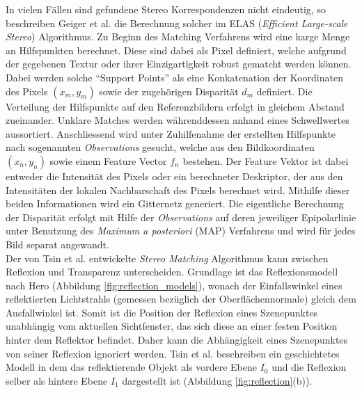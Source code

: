 \noindent
In vielen Fällen sind gefundene Stereo Korrespondenzen nicht eindeutig, so beschreiben Geiger et al. \cite{geiger2011efficient} die Berechnung solcher im ELAS (\emph{Efficient Large-scale Stereo}) Algorithmus. Zu Beginn des Matching Verfahrens wird eine karge Menge an Hilfspunkten berechnet. Diese sind dabei als Pixel definiert, welche aufgrund der gegebenen Textur oder ihrer Einzigartigkeit robust gematcht werden können. Dabei werden solche \enquote{Support Points} als eine Kon­ka­te­na­ti­on der Koordinaten des Pixels $(x_m,y_m)$ sowie der zugehörigen Disparität $d_m$ definiert. Die Verteilung der Hilfspunkte auf den Referenzbildern erfolgt in gleichem Abstand zueinander. Unklare Matches werden währenddessen anhand eines Schwellwertes aussortiert. Anschliessend wird unter Zuhilfenahme der erstellten Hilfspunkte nach sogenannten \emph{Observations} gesucht, welche aus den Bildkoordinaten $(x_n,y_n)$ sowie einem Feature Vector $f_n$ bestehen. Der Feature Vektor ist dabei entweder die Intensität des Pixels oder ein berechneter Deskriptor, der aus den Intensitäten der lokalen Nachbarschaft des Pixels berechnet wird. Mithilfe dieser beiden Informationen wird ein Gitternetz generiert. Die eigentliche Berechnung der Disparität erfolgt mit Hilfe der \emph{Observations} auf deren jeweiliger Epipolarlinie unter Benutzung des \emph{Maximum a posteriori} (MAP) Verfahrens und wird für jedes Bild separat angewandt.\\

\noindent
Der von Tsin et al. \cite{tsin2003stereo} entwickelte \emph{Stereo Matching} Algorithmus kann zwischen Reflexion und Transparenz unterscheiden.
Grundlage ist das Reflexionsmodell nach Hero (Abbildung \ref{fig:reflection_models}), wonach der Einfallswinkel eines reflektierten Lichtstrahls (gemessen bezüglich der Oberflächennormale) gleich dem Ausfallwinkel ist. Somit ist die Position der Reflexion eines Szenepunktes unabhängig vom aktuellen Sichtfenster, das sich diese an einer festen Position hinter dem Reflektor befindet. Daher kann die Abhängigkeit eines Szenepunktes von seiner Reflexion ignoriert werden. Tsin et al. beschreiben ein geschichtetes Modell in dem das reflektierende Objekt als vordere Ebene $I_0$ und die Reflexion selber als hintere Ebene $I_1$ dargestellt ist (Abbildung \ref{fig:reflection}(b)).\\

